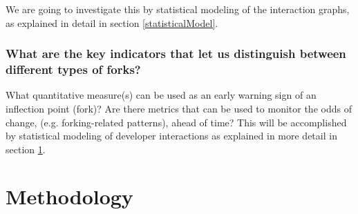 \documentclass[11pt]{report}
\begin{document}
We are going to investigate this by statistical modeling of the interaction graphs, as explained in detail in section \ref{statisticalModel}.

\subsubsection{\hspace{4 mm} What are the key indicators that let us distinguish between different types of forks?\\}

What quantitative measure(s) can be used as an early warning sign of an inflection point (fork)? Are there metrics that can be used to monitor the odds of change, (e.g. forking-related patterns), ahead of time? This will be accomplished by statistical modeling of developer interactions as explained in more detail in section \ref{methodology}.

%
%

\pagebreak

\section{Methodology}
\label{methodology}
\end{document}
